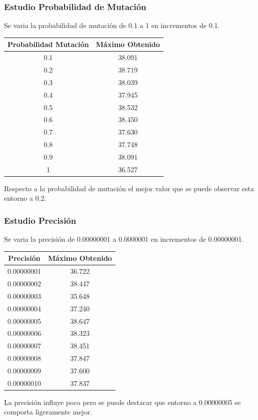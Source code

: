 \documentclass[12pt]{article}
\begin{document}
\subsubsection*{Estudio Probabilidad de Mutación}
	Se varia la probabilidad de mutación de 0.1 a 1 en incrementos de 0.1.
\begin{table}[H]
\begin{center}
\begin{tabular}{|cc|} \hline
Probabilidad Mutación & Máximo Obtenido \\  \hline
0.1 & 38.091 \\ 
0.2 & 38.719 \\ 
0.3 & 38.039 \\
0.4 & 37.945 \\
0.5 & 38.532 \\
0.6 & 38.450 \\
0.7 & 37.630 \\
0.8 & 37.748 \\ 
0.9 & 38.091 \\
1   & 36.527 \\  \hline
\end{tabular}
\end{center}
\end{table}
	Respecto a la probabilidad de mutación el mejor valor que se puede observar esta entorno a 0.2.

\subsubsection*{Estudio Precisión}
	Se varia la precisión de 0.00000001 a 0.0000001 en incrementos de 0.00000001.
\begin{table}[H]
\begin{center}
\begin{tabular}{|cc|} \hline
Precisión & Máximo Obtenido \\  \hline
0.00000001 & 36.722 \\ 
0.00000002 & 38.447 \\ 
0.00000003 & 35.648 \\
0.00000004 & 37.240 \\
0.00000005 & 38.647 \\
0.00000006 & 38.323 \\
0.00000007 & 38.451\\
0.00000008 & 37.847 \\ 
0.00000009 & 37.600 \\
0.00000010 & 37.837 \\  \hline
\end{tabular}
\end{center}
\end{table}
	La precisión influye poco pero se puede destacar que entorno a 0.00000005 se comporta ligeramente mejor. 
\end{document}
